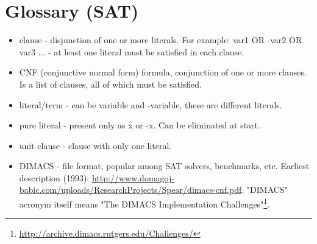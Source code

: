 ﻿\chapter{Glossary (SAT)}

\begin{itemize}

\item clause - disjunction of one or more literals. For example: var1 OR -var2 OR var3 ... - at least one literal must be satisfied in each clause.

\item CNF (conjunctive normal form) formula, conjunction of one or more clauses. Is a list of clauses, all of which must be satisfied.

\item literal/term - can be variable and -variable, these are different literals.

\item pure literal - present only as x or -x. Can be eliminated at start.

\item unit clause - clause with only one literal.

\item DIMACS - file format, popular among SAT solvers, benchmarks, etc.
Earliest description (1993): \url{http://www.domagoj-babic.com/uploads/ResearchProjects/Spear/dimacs-cnf.pdf}.
"DIMACS" acronym itself means "The DIMACS Implementation Challenges"\footnote{\url{http://archive.dimacs.rutgers.edu/Challenges/}}.

\end{itemize}
